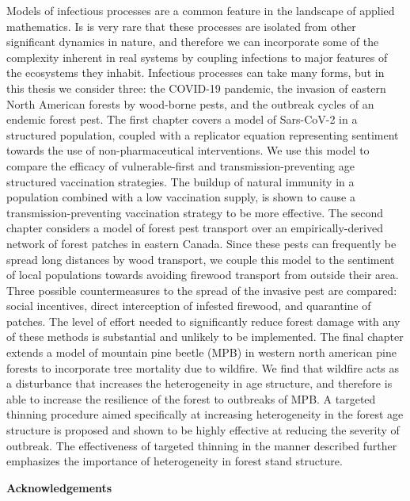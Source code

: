 Models of infectious processes are a common feature in the landscape of applied mathematics. Is is very rare that these processes are isolated from other significant dynamics in nature, and therefore we can incorporate some of the complexity inherent in real systems by coupling infections to major features of the ecosystems they inhabit. Infectious processes can take many forms, but in this thesis we consider three: the COVID-19 pandemic, the invasion of eastern North American forests by wood-borne pests, and the outbreak cycles of an endemic forest pest. The first chapter covers a model of Sars-CoV-2 in a structured population, coupled with a replicator equation representing sentiment towards the use of non-pharmaceutical interventions. We use this model to compare the efficacy of vulnerable-first and transmission-preventing age structured vaccination strategies. The buildup of natural immunity in a population combined with a low vaccination supply, is shown to cause a transmission-preventing vaccination strategy to be more effective. The second chapter considers a model of forest pest transport over an empirically-derived network of forest patches in eastern Canada. Since these pests can frequently be spread long distances by wood transport, we couple this model to the sentiment of local populations towards avoiding firewood transport from outside their area. Three possible countermeasures to the spread of the invasive pest are compared: social incentives, direct interception of infested firewood, and quarantine of patches. The level of effort needed to significantly reduce forest damage with any of these methods is substantial and unlikely to be implemented. The final chapter extends a model of mountain pine beetle (MPB) in western north american pine forests to incorporate tree mortality due to wildfire. We find that wildfire acts as a disturbance that increases the heterogeneity in age structure, and therefore is able to increase the resilience of the forest to outbreaks of MPB. A targeted thinning procedure aimed specifically at increasing heterogeneity in the forest age structure is proposed and shown to be highly effective at reducing the severity of outbreak. The effectiveness of targeted thinning in the manner described further emphasizes the importance of heterogeneity in forest stand structure.



\cleardoublepage


\begin{center}\textbf{Acknowledgements}\end{center}

